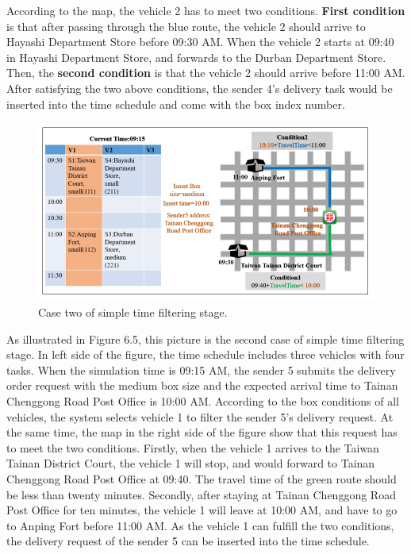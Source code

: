 \documentclass[12pt]{ksthesis}
\begin{document}
\begin{thesis}
{According to the map, the vehicle 2 has to meet two conditions. \textbf{First condition} is that after passing through the blue route, the vehicle 2 should arrive to Hayashi Department Store before 09:30 AM. 
When the vehicle 2 starts at 09:40 in Hayashi Department Store, and forwards to the Durban Department Store. Then, the \textbf{second condition} is that the vehicle 2 should arrive before 11:00 AM.
After satisfying the two above conditions, the sender 4’s delivery task would be inserted into the time schedule and come with the box index number. 

\begin{figure}[H]
\centering
\includegraphics[width=1.0\textwidth]{./Thesis_figures/F6-5_caseTwo_SchedulingStage.PNG}
\caption{\large Case two of simple time filtering stage.}
\vspace{0.5cm}
\label{Fig:CaseTwo_TimeFiltering}
\end{figure}

As illustrated in Figure 6.5, this picture is the second case of simple time filtering stage. In left side of the figure, the time schedule includes three vehicles with four tasks. When the simulation time is 09:15 AM, the sender 5 submits the delivery order request with the medium box size and the expected arrival time to Tainan Chenggong Road Post Office is 10:00 AM.
According to the box conditions of all vehicles, the system selects vehicle 1 to filter the sender 5’s delivery request. At the same time, the map in the right side of the figure show that this request has to meet the two conditions. Firstly, when the vehicle 1 arrives to the Taiwan Tainan District Court, the vehicle 1 will stop, and would forward to Tainan Chenggong Road Post Office at 09:40. The travel time of the green route should be less than twenty minutes. Secondly, after staying at Tainan Chenggong Road Post Office for ten minutes, the vehicle 1 will leave at 10:00 AM, and have to go to Anping Fort before 11:00 AM. 
As the vehicle 1 can fulfill the two conditions, the delivery request of the sender 5 can be inserted into the time schedule.




}
\end{thesis}
\end{document}
